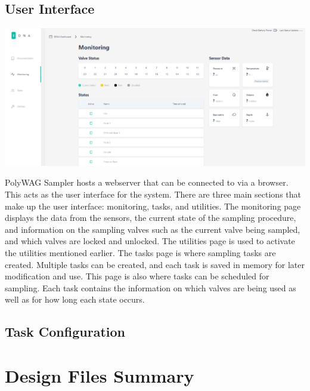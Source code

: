 \documentclass[11pt, letterpaper]{article}
\begin{document}
\subsection{User Interface}

\begin{center}
	\includegraphics[scale=0.35]{./Assets/UI.png}
\end{center}

PolyWAG Sampler hosts a webserver that can be connected to via a browser. This acts as the user interface for the system. There are three main sections that make up the user interface: monitoring, tasks, and utilities. The monitoring page displays the data from the sensors, the current state of the sampling procedure, and information on the sampling valves such as the current valve being sampled, and which valves are locked and unlocked. The utilities page is used to activate the utilities mentioned earlier. The tasks page is where sampling tasks are created. Multiple tasks can be created, and each task is saved in memory for later modification and use. This page is also where tasks can be scheduled for sampling. Each task contains the information on which valves are being used as well as for how long each state occurs. 


\subsection{Task Configuration}

\section{Design Files Summary}
%
%
\end{document}
